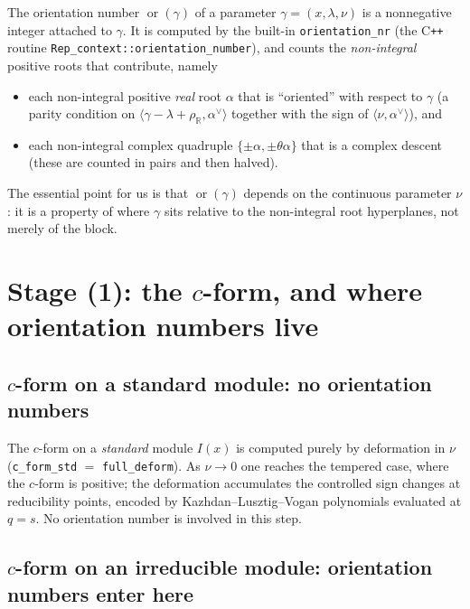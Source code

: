 \documentclass[11pt]{article}
\newcommand{\orr}{\operatorname{or}}
\begin{document}
The orientation number $\orr(\gamma)$ of a parameter $\gamma=(x,\lambda,\nu)$ is a
nonnegative integer attached to $\gamma$.  It is computed by the built-in
\texttt{orientation\_nr} (the C\texttt{++} routine
\texttt{Rep\_context::orientation\_number}), and counts the \emph{non-integral}
positive roots that contribute, namely
\begin{itemize}
  \item each non-integral positive \emph{real} root $\alpha$ that is
        ``oriented'' with respect to $\gamma$ (a parity condition on
        $\langle\gamma-\lambda+\rho_{\mathbb R},\alpha^\vee\rangle$ together with
        the sign of $\langle\nu,\alpha^\vee\rangle$), and
  \item each non-integral complex quadruple $\{\pm\alpha,\pm\theta\alpha\}$ that
        is a complex descent (these are counted in pairs and then halved).
\end{itemize}
The essential point for us is that $\orr(\gamma)$ depends on the continuous
parameter $\nu$: it is a property of where $\gamma$ sits relative to the
non-integral root hyperplanes, not merely of the block.

\section{Stage (1): the $c$-form, and where orientation numbers live}

\subsection*{$c$-form on a standard module: no orientation numbers}

The $c$-form on a \emph{standard} module $I(x)$ is computed purely by
deformation in $\nu$ (\texttt{c\_form\_std} $=$ \texttt{full\_deform}).  As
$\nu\to0$ one reaches the tempered case, where the $c$-form is positive; the
deformation accumulates the controlled sign changes at reducibility points,
encoded by Kazhdan--Lusztig--Vogan polynomials evaluated at $q=s$.  No
orientation number is involved in this step.

\subsection*{$c$-form on an irreducible module: orientation numbers enter here}
\end{document}

